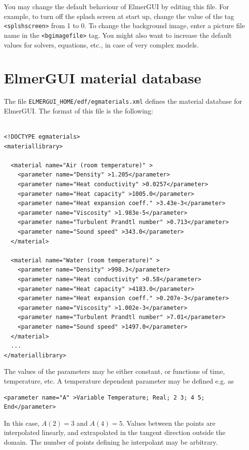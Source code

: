 \documentclass[a4paper,12pt]{article}
\begin{document}
You may change the default behaviour of ElmerGUI by editing this file. For example, to turn off the splash screen at start up, change the value of the tag {\tt <splshscreen>} from 1 to 0. To change the background image, enter a picture file name in the {\tt <bgimagefile>} tag. You might also want to increase the default values for solvers, equations, etc., in case of very complex models.

\section{ElmerGUI material database}

The file {\tt ELMERGUI\_HOME/edf/egmaterials.xml} defines the material database for ElmerGUI. The
format of this file is the following:

\begin{footnotesize}
\begin{verbatim}
 
<!DOCTYPE egmaterials>
<materiallibrary>
  
  <material name="Air (room temperature)" >
    <parameter name="Density" >1.205</parameter>
    <parameter name="Heat conductivity" >0.0257</parameter>
    <parameter name="Heat capacity" >1005.0</parameter>
    <parameter name="Heat expansion coeff." >3.43e-3</parameter>
    <parameter name="Viscosity" >1.983e-5</parameter>
    <parameter name="Turbulent Prandtl number" >0.713</parameter>
    <parameter name="Sound speed" >343.0</parameter>
  </material>

  <material name="Water (room temperature)" >
    <parameter name="Density" >998.3</parameter>
    <parameter name="Heat conductivity" >0.58</parameter>
    <parameter name="Heat capacity" >4183.0</parameter>
    <parameter name="Heat expansion coeff." >0.207e-3</parameter>
    <parameter name="Viscosity" >1.002e-3</parameter>
    <parameter name="Turbulent Prandtl number" >7.01</parameter>
    <parameter name="Sound speed" >1497.0</parameter>
  </material>
  ...
</materiallibrary>

\end{verbatim}
\end{footnotesize}

The values of the parameters may be either constant, or functions of time, temperature, etc.
A temperature dependent parameter may be defined e.g. as

\begin{footnotesize}
\begin{verbatim}
<parameter name="A" >Variable Temperature; Real; 2 3; 4 5; End</parameter>
\end{verbatim}
\end{footnotesize}
In this case, $A(2)=3$ and $A(4)=5$. Values between the points are interpolated linearly,
and extrapolated in the tangent direction outside the domain. The number of points defining 
he interpolant may be arbitrary. 
\end{document}
